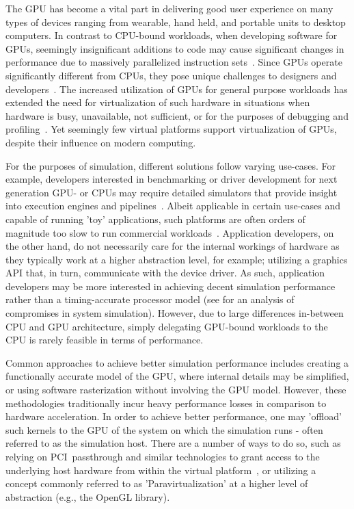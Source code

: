 The GPU has become a vital part in delivering good user experience on many types of devices ranging from wearable, hand held, and portable units to desktop computers.
In contrast to CPU-bound workloads, when developing software for GPUs, seemingly insignificant additions to code may cause significant changes in performance due to massively parallelized instruction sets~.
Since GPUs operate significantly different from CPUs, they pose unique challenges to designers and developers~.
The increased utilization of GPUs for general purpose workloads has extended the need for virtualization of such hardware in situations when hardware is busy, unavailable, not sufficient, or for the purposes of debugging and profiling~.
Yet seemingly few virtual platforms support virtualization of GPUs, despite their influence on modern computing.

For the purposes of simulation, different solutions follow varying use-cases.
For example, developers interested in benchmarking or driver development for next generation GPU- or CPUs may require detailed simulators that provide insight into execution engines and pipelines~.
Albeit applicable in certain use-cases and capable of running 'toy' applications, such platforms are often orders of magnitude too slow to run commercial workloads~.
Application developers, on the other hand, do not necessarily care for the internal workings of hardware as they typically work at a higher abstraction level, for example; utilizing a graphics API that, in turn, communicate with the device driver.
As such, application developers may be more interested in achieving decent simulation performance rather than a timing-accurate processor model (see  for an analysis of compromises in system simulation).
However, due to large differences in-between CPU and GPU architecture, simply delegating GPU-bound workloads to the CPU is rarely feasible in terms of performance.

Common approaches to achieve better simulation performance includes creating a functionally accurate model of the GPU, where internal details may be simplified, or using software rasterization without involving the GPU model.
However, these methodologies traditionally incur heavy performance losses in comparison to hardware acceleration.
In order to achieve better performance, one may 'offload' such kernels to the GPU of the system on which the simulation runs - often referred to as the simulation host.
There are a number of ways to do so, such as relying on PCI~passthrough and similar technologies to grant access to the underlying host hardware from within the virtual platform~, or utilizing a concept commonly referred to as 'Paravirtualization' at a higher level of abstraction (e.g., the OpenGL library).

